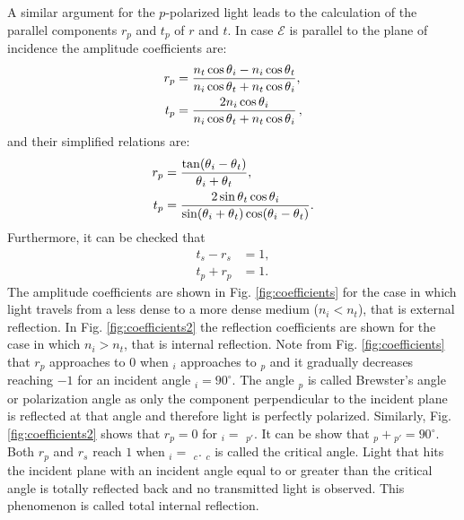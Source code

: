 \indent A similar argument for the $p$-polarized light leads to the calculation of the parallel components $r_p$ and $t_p$ of $r$ and $t$. 
In case $\boldsymbol{\mathcal{E}}$ is parallel to the plane of incidence the amplitude coefficients are:
\begin{equation}\label{Fresnel_parallel}
\begin{split}
r_{p} & = \frac{n_t\cos\mbox{$\theta$}_i-n_i \cos\mbox{$\theta$}_t}{n_i \cos\mbox{$\theta$}_t+n_t\cos\mbox{$\theta$}_i},\\
t_{p} & =  \frac{2n_i\cos\mbox{$\theta$}_i}{n_i\cos\mbox{$\theta$}_t+n_t\cos\mbox{$\theta$}_i}\,,
\end{split}
\end{equation}
and their simplified relations are:
\begin{equation} \label{simple_Fresnel}
\begin{split}
r_{p} & =  \frac{\tan(\mbox{$\theta$}_i-\mbox{$\theta$}_t)}{\mbox{$\theta$}_i+\mbox{$\theta$}_t},\\
t_{p} & = \frac{2\sin \mbox{$\theta$}_t \cos \mbox{$\theta$}_i}{\sin(\mbox{$\theta$}_i+\mbox{$\theta$}_t)\cos(\mbox{$\theta$}_i- \mbox{$\theta$}_t)}.
\end{split}
\end{equation}
Furthermore, it can be checked that
 \begin{equation}
\begin{split}
t_s-r_s &= 1, \\
t_p+r_p &=  1.
\end{split}
\end{equation}
The amplitude coefficients are shown in Fig. \ref{fig:coefficients} for the case in which light travels from a less dense to a more dense medium ($n_i<n_t$), that is external reflection. 
In Fig. \ref{fig:coefficients2} the reflection coefficients are shown for the case in which $n_i>n_t$, that is internal reflection. Note from Fig. \ref{fig:coefficients} that $r_p$ approaches to $0$ when \myangle$_i$ approaches to \myangle$_p$ and it gradually decreases reaching $-1$ for an incident angle \myangle$_i=90^\circ$. The angle \myangle$_p$ is called Brewster's angle or polarization angle as only the component perpendicular to the incident plane is reflected at that angle and therefore light is perfectly polarized. Similarly, Fig. \ref{fig:coefficients2} shows that $r_p=0$ for \myangle$_i= $ \myangle$_{p\prime}$. It can be show that \myangle$_p+ $\myangle$_{p\prime}= 90^\circ$. Both $r_p$ and $r_s$ reach $1$ when \myangle$_i= $ \myangle$_c$. \myangle$_c$ is called the critical angle. Light that hits the incident plane with an incident angle equal to or greater than the critical angle is totally reflected back and no transmitted light is observed. This phenomenon is called total internal reflection. 
